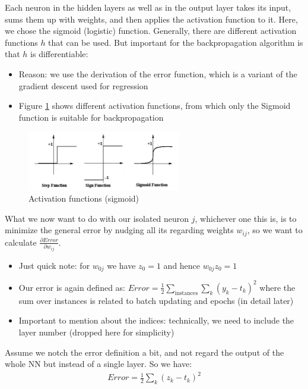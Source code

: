 Each neuron in the hidden layers as well as in the output layer takes its input, sums them up with weights, and then applies the activation function to it. Here, we chose the sigmoid (logistic) function. Generally, there are different activation functions $h$ that can be used. But important for the backpropagation algorithm is that $h$ is differentiable:
\begin{itemize}
  \item Reason: we use the derivation of the error function, which is a variant of the gradient descent used for regression
  \item Figure \ref{fig:6_bp_h} shows different activation functions, from which only the Sigmoid function is suitable for backpropagation
\end{itemize}

\begin{figure}[H]
  \centering
  \includegraphics[width=0.6\textwidth]{assets/nn/bp__sigmoid.png}

  \caption{Activation functions (sigmoid)}
  \label{fig:6_bp_h}
\end{figure}

What we now want to do with our isolated neuron $j$, whichever one this is, is to minimize the general error by nudging all its regarding weights $w_{ij}$, so we want to calculate $\frac{\partial Error}{\partial w_{ij}}$.
\begin{itemize}
  \item Just quick note: for $w_{0j}$ we have $z_0 = 1$ and hence $w_{0j}z_0 = 1$
  \item Our error is again defined as: $Error = \frac{1}{2}\sum_{\text{instances}}\sum_k (y_k - t_k)^2$ where the sum over instances is related to batch updating and epochs (in detail later)
  \item Important to mention about the indices: technically, we need to include the layer number (dropped here for simplicity)
\end{itemize}

Assume we notch the error definition a bit, and not regard the output of the whole NN but instead of a single layer. So we have:
\begin{align*}
  Error = \frac{1}{2}\sum_k (z_k - t_k)^2
\end{align*}

